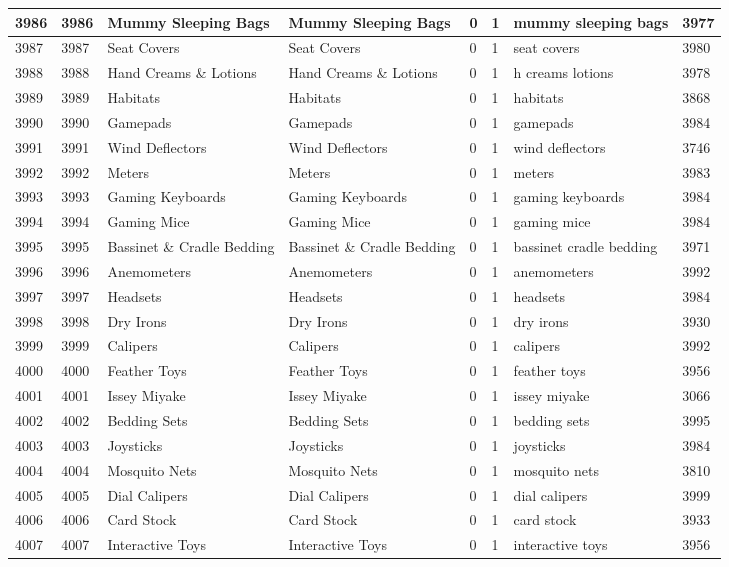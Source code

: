\begin{longtable}{|l|l|l|l|l|l|l|l|}
3986 & 3986 & Mummy Sleeping Bags & Mummy Sleeping Bags & 0 & 1 & mummy sleeping bags & 3977 \\ \hline 
3987 & 3987 & Seat Covers & Seat Covers & 0 & 1 & seat covers & 3980 \\ \hline 
3988 & 3988 & Hand Creams \& Lotions & Hand Creams \& Lotions & 0 & 1 & h creams lotions & 3978 \\ \hline 
3989 & 3989 & Habitats & Habitats & 0 & 1 & habitats & 3868 \\ \hline 
3990 & 3990 & Gamepads & Gamepads & 0 & 1 & gamepads & 3984 \\ \hline 
3991 & 3991 & Wind Deflectors & Wind Deflectors & 0 & 1 & wind deflectors & 3746 \\ \hline 
3992 & 3992 & Meters & Meters & 0 & 1 & meters & 3983 \\ \hline 
3993 & 3993 & Gaming Keyboards & Gaming Keyboards & 0 & 1 & gaming keyboards & 3984 \\ \hline 
3994 & 3994 & Gaming Mice & Gaming Mice & 0 & 1 & gaming mice & 3984 \\ \hline 
3995 & 3995 & Bassinet \& Cradle Bedding & Bassinet \& Cradle Bedding & 0 & 1 & bassinet cradle bedding & 3971 \\ \hline 
3996 & 3996 & Anemometers & Anemometers & 0 & 1 & anemometers & 3992 \\ \hline 
3997 & 3997 & Headsets & Headsets & 0 & 1 & headsets & 3984 \\ \hline 
3998 & 3998 & Dry Irons & Dry Irons & 0 & 1 & dry irons & 3930 \\ \hline 
3999 & 3999 & Calipers & Calipers & 0 & 1 & calipers & 3992 \\ \hline 
4000 & 4000 & Feather Toys & Feather Toys & 0 & 1 & feather toys & 3956 \\ \hline 
4001 & 4001 & Issey Miyake & Issey Miyake & 0 & 1 & issey miyake & 3066 \\ \hline 
4002 & 4002 & Bedding Sets & Bedding Sets & 0 & 1 & bedding sets & 3995 \\ \hline 
4003 & 4003 & Joysticks & Joysticks & 0 & 1 & joysticks & 3984 \\ \hline 
4004 & 4004 & Mosquito Nets & Mosquito Nets & 0 & 1 & mosquito nets & 3810 \\ \hline 
4005 & 4005 & Dial Calipers & Dial Calipers & 0 & 1 & dial calipers & 3999 \\ \hline 
4006 & 4006 & Card Stock & Card Stock & 0 & 1 & card stock & 3933 \\ \hline 
4007 & 4007 & Interactive Toys & Interactive Toys & 0 & 1 & interactive toys & 3956 \\ \hline 

\end{longtable}
